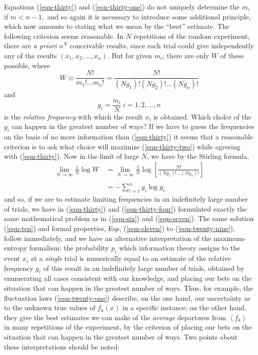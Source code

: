 \documentclass[]{article}
\begin{document}
%
Equations (\ref{eqn-thirty}) and (\ref{eqn-thirty-one}) do not uniquely determine the \(m_{i}\) if
\(m < n - 1,\) and so again it is necessary to introduce some additional
principle, which now amounts to stating what we mean by the ``best''
estimate. The following criterion seems reasonable. In \(N\) repetitions
of the random experiment, there are \emph{a priori} \(n^{N}\)
conceivable results, since each trial could give independently any of
the results \(\left( x_{1},x_{2},\ldots,x_{n} \right)\). But for given
\(m_{i}\), there are only \(W\) of these possible, where
%
\begin{equation}
W \equiv \frac{N!}{m_{1}!\ldots m_{n}!} = \frac{N!}{\left( Ng_{1} \right)!\left( Ng_{2} \right)!\ldots\left( Ng_{n} \right)!} \label{eqn-thirty-two}
\end{equation}
%
and
%
\begin{equation}
g_{i} = \frac{m_{i}}{N}\ i = 1,2,\ldots,n
\end{equation}
%
is the \emph{relative frequency} with which the result \(x_{i}\) is obtained.
Which cholce of the \(g_{i}\) can happen in the greatest number of ways?
If we have to guess the frequencies on the basis of no more information
than (\ref{eqn-thirty}) it seems that a reasonable criterion is to ask what
choice will maximize (\ref{eqn-thirty-two}) while agreeing with (\ref{eqn-thirty}). Now in the limit of
large \(N\), we have by the Stirling formula,
%
\begin{align}
\lim_{N \rightarrow \infty} \frac{1}{N}\log W & \  = \lim_{N \rightarrow \infty} \frac{1}{N}\log\left\lbrack
\frac{N!}{\left( Ng_{1} \right)!\ldots\left( Ng_{n} \right)!} \right\rbrack \nonumber \\
\label{eqn-thirty-four}\\
 & \  = - \sum_{i = 1}^{n}   g_{i}\log g_{i} \nonumber
\end{align}
%
and so, if we are to estimate limiting frequencies in an indefinitely
large number of trials, we have in (\ref{eqn-thirty}) and (\ref{eqn-thirty-four}) formulated exactly the
same mathematical problem as in (\ref{eqn-six}) and (\ref{eqn-seven}). The same solution (\ref{eqn-ten}) and
formal properties, Eqs, (\ref{eqn-eleven}) to (\ref{eqn-twenty-nine}), follow immediately, and we have an
alternative interpretation of the maximum-entropy formalism: the
probability \(p_{i}\) which information theory assigns to the event
\(x_{i}\) at a \emph{single} trial is numerically equal to an estimate
of the relative frequency \(g_{i}\) of this result in an indefinitely
large number of trials, obtained by enumerating all cases consistent
with our knowledge, and placing our bets on the situation that can
happen in the greatest number of ways. Thus, for example, the
fluctuation laws (\ref{eqn-twenty-one}) describe, on the one hand, our uncertainty as to
the unknown true values of \(f_{k}(x)\) in a specific instance; on the
other hand, they give the best estimates we can make of the
\emph{average} departures from \(\left\langle f_{k} \right\rangle\) in
many repetitions of the experiment, by the criterion of placing our bets
on the situation that can happen in the greatest number of ways. Two
points about these interpretations should be noted:
\end{document}
